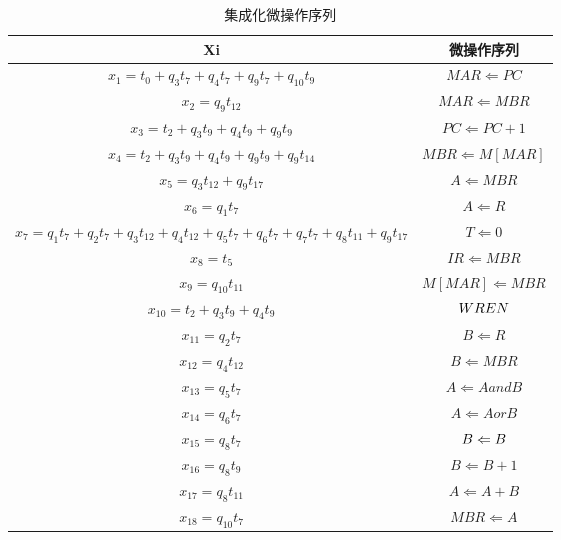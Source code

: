 \documentclass[UTF8]{ctexart}
\begin{document}
    \begin{table}[!htb]
      \centering
      \begin{tabular}{|c|c|}
        \hline
        \textbf{Xi} & \textbf{微操作序列} \\
        \hline
        $x_1=t_0+q_3t_7+q_4t_7+q_9t_7+q_{10}t_9$    &   $MAR\Leftarrow PC$\\
        \hline
        $x_2=q_9t_{12}                  $    &   $MAR\Leftarrow MBR$\\
        \hline
        $x_3=t_2+q_3t_9+q_4t_9+q_9t_9      $    &   $PC\Leftarrow PC+1$\\
        \hline
        $x_4=t_2+q_3t_9+q_4t_9+q_9t_9+q_9t_{14}$    &   $MBR\Leftarrow M[MAR]$\\
        \hline
        $x_5=q_3t_{12}+q_9t_{17}            $    &   $A\Leftarrow MBR$\\
        \hline
        $x_6=q_1t_7                   $    &   $A\Leftarrow R$\\
        \hline
        $x_7=q_1t_7+q_2t_7+q_3t_{12}+q_4t_{12}+q_5t_7+q_6t_7+q_7t_7+q_8t_{11}+q_9t_{17}$ & $T\Leftarrow 0$\\
        \hline
        $x_8=t_5                     $    &   $IR\Leftarrow MBR$\\
        \hline
        $x_9=q_{10}t_{11}                 $    &   $M[MAR]\Leftarrow MBR$\\
        \hline
        $x_{10}=t_2+q_3t_9+q_4t_9           $    &   $\/WREN$\\
        \hline
        $x_{11}=q_2t_7                  $    &   $B\Leftarrow R$\\
        \hline
        $x_{12}=q_4t_{12}                 $    &   $B\Leftarrow MBR$\\
        \hline
        $x_{13}=q_5t_7                  $    &   $A\Leftarrow AandB$\\
        \hline
        $x_{14}=q_6t_7                  $    &   $A\Leftarrow AorB$\\
        \hline
        $x_{15}=q_8t_7                  $    &   $B\Leftarrow \-B$\\
        \hline
        $x_{16}=q_8t_9                  $    &   $B\Leftarrow B+1$\\
        \hline
        $x_{17}=q_8t_{11}                 $    &   $A\Leftarrow A+B$\\
        \hline
        $x_{18}=q_{10}t_7                 $    &   $MBR\Leftarrow A$\\
        \hline
      \end{tabular}
      \caption{集成化微操作序列}\label{集成化微操作序列}
    \end{table}
\end{document}
